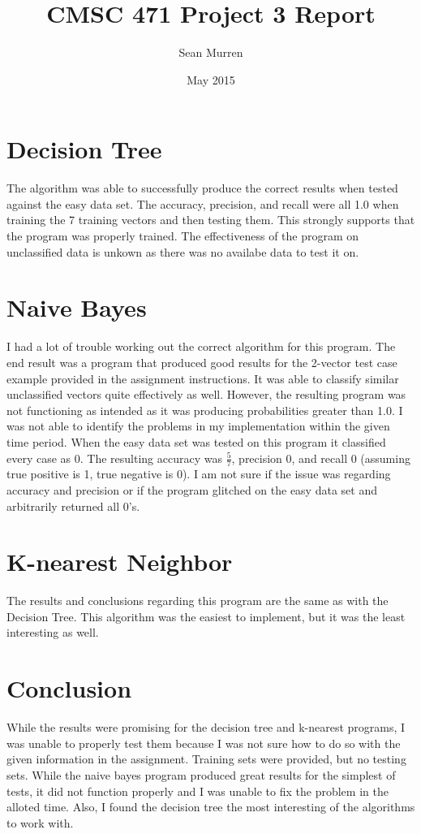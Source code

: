 \documentclass{article}
\title{\vspace{-3.0cm}CMSC 471 Project 3 Report}
\author{Sean Murren}
\date{May 2015}
\begin{document}
	\maketitle
    \section{Decision Tree}
    The algorithm was able to successfully produce the correct results when tested against the easy data set.  The accuracy,  precision, and recall were all 1.0 when training the 7 training vectors and then testing them.  This strongly supports that the program was properly trained.  The effectiveness of the program on unclassified data is unkown as there was no availabe data to test it on.
    
    \section{Naive Bayes}
    I had a lot of trouble working out the correct algorithm for this program.  The end result was a program that produced good results for the 2-vector test case example provided in the assignment instructions.  It was able to classify similar unclassified vectors quite effectively as well.  However, the resulting program was not functioning as intended as it was producing probabilities greater than 1.0.  I was not able to identify the problems in my implementation within the given time period.  When the easy data set was tested on this program it classified every case as 0.  The resulting accuracy was \( \frac{5}{7} \), precision 0, and recall 0 (assuming true positive is 1, true negative is 0).  I am not sure if the issue was regarding accuracy and precision or if the program glitched on the easy data set and arbitrarily returned all 0's.
    
    \section{K-nearest Neighbor}
    The results and conclusions regarding this program are the same as with the Decision Tree.  This algorithm was the easiest to implement, but it was the least interesting as well.
    
    \section{Conclusion}
    While the results were promising for the decision tree and k-nearest programs, I was unable to properly test them because I was not sure how to do so with the given information in the assignment.  Training sets were provided, but no testing sets.  While the naive bayes program produced great results for the simplest of tests, it did not function properly and I was unable to fix the problem in the alloted time.  Also, I found the decision tree the most interesting of the algorithms to work with.
\end{document}
